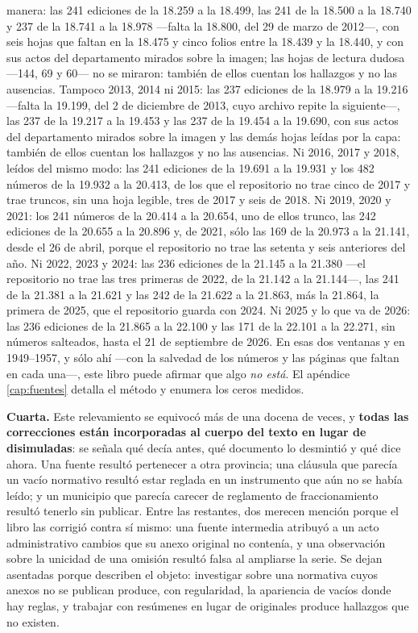 manera: las 241 ediciones de la 18.259 a la 18.499, las 241 de la 18.500 a la 18.740 y 237 de la 18.741 a la 18.978 ---falta la 18.800, del 29 de marzo de 2012---, con seis hojas que faltan en la 18.475 y cinco folios entre la 18.439 y la 18.440, y con sus actos del departamento mirados sobre la imagen; las hojas de lectura dudosa ---144, 69 y 60--- no se miraron: también de ellos cuentan los hallazgos y no las ausencias. Tampoco 2013, 2014 ni 2015: las 237 ediciones de la 18.979 a la 19.216 ---falta la 19.199, del 2 de diciembre de 2013, cuyo archivo repite la siguiente---, las 237 de la 19.217 a la 19.453 y las 237 de la 19.454 a la 19.690, con sus actos del departamento mirados sobre la imagen y las demás hojas leídas por la capa: también de ellos cuentan los hallazgos y no las ausencias. Ni 2016, 2017 y 2018, leídos del mismo modo: las 241 ediciones de la 19.691 a la 19.931 y los 482 números de la 19.932 a la 20.413, de los que el repositorio no trae cinco de 2017 y trae truncos, sin una hoja legible, tres de 2017 y seis de 2018. Ni 2019, 2020 y 2021: los 241 números de la 20.414 a la 20.654, uno de ellos trunco, las 242 ediciones de la 20.655 a la 20.896 y, de 2021, sólo las 169 de la 20.973 a la 21.141, desde el 26 de abril, porque el repositorio no trae las setenta y seis anteriores del año. Ni 2022, 2023 y 2024: las 236 ediciones de la 21.145 a la 21.380 ---el repositorio no trae las tres primeras de 2022, de la 21.142 a la 21.144---, las 241 de la 21.381 a la 21.621 y las 242 de la 21.622 a la 21.863, más la 21.864, la primera de 2025, que el repositorio guarda con 2024. Ni 2025 y lo que va de 2026: las 236 ediciones de la 21.865 a la 22.100 y las 171 de la 22.101 a la 22.271, sin números salteados, hasta el 21 de septiembre de 2026. En esas dos ventanas y en 1949--1957, y sólo ahí ---con la salvedad de los números y las páginas que faltan en cada una---, este libro puede afirmar que algo \textit{no está}. El apéndice \ref{cap:fuentes} detalla el método y enumera los ceros medidos.

\textbf{Cuarta.} Este relevamiento se equivocó más de una docena de veces, y \textbf{todas las correcciones
están incorporadas al cuerpo del texto en lugar de disimuladas}: se señala qué decía antes,
qué documento lo desmintió y qué dice ahora. Una fuente resultó pertenecer a otra provincia; una cláusula que parecía un vacío normativo resultó estar reglada en un instrumento que aún no se había leído; y un municipio que parecía carecer de reglamento de fraccionamiento resultó tenerlo sin publicar. Entre las restantes, dos merecen mención porque el libro las corrigió contra sí mismo: una fuente intermedia atribuyó a un acto administrativo cambios que su anexo original no contenía, y una observación sobre la unicidad de una omisión resultó falsa al ampliarse la serie. Se dejan asentadas porque describen el objeto: investigar sobre una normativa cuyos anexos no se publican produce, con regularidad, la apariencia de vacíos donde hay reglas, y trabajar con resúmenes en lugar de originales produce hallazgos que no existen.

